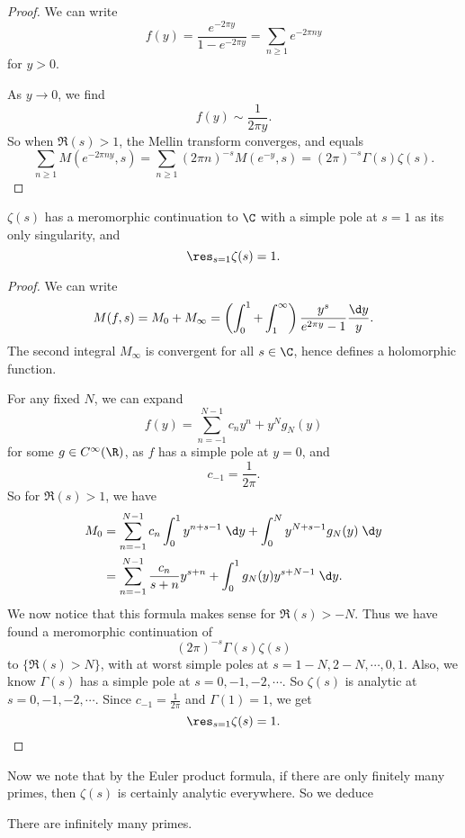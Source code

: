 \documentclass[a4paper]{article}
\begin{document}
\begin{proof}
  We can write
  \[
    f(y) = \frac{e^{-2\pi y}}{1 - e^{-2 \pi y}} = \sum_{n \geq 1} e^{-2\pi n y}
  \]
  for $y > 0$.

  As $y \to 0$, we find
  \[
    f(y) \sim \frac{1}{2\pi y}.
  \]
  So when $\Re(s) > 1$, the Mellin transform converges, and equals
  \[
    \sum_{n \geq 1} M(e^{-2\pi n y}, s) = \sum_{n \geq 1} (2\pi n)^{-s} M(e^{-y}, s) = (2\pi)^{-s} \Gamma(s) \zeta(s).
  \]
\end{proof}

\begin{cor}
  $\zeta(s)$ has a meromorphic continuation to $\C$ with a simple pole at $s = 1$ as its only singularity, and
  \[
    \res_{s = 1}\zeta(s) = 1.
  \]
\end{cor}

\begin{proof}
  We can write
  \[
    M(f, s) = M_0 + M_\infty = \left(\int_0^1 + \int_1^\infty\right) \frac{y^s}{e^{2\pi y} - 1} \frac{\d y}{y}.
  \]
  The second integral $M_\infty$ is convergent for all $s \in \C$, hence defines a holomorphic function.

  For any fixed $N$, we can expand
  \[
    f(y) = \sum_{n = -1}^{N - 1} c_n y^n + y^N g_N(y)
  \]
  for some $g \in C^\infty(\R)$, as $f$ has a simple pole at $y = 0$, and
  \[
    c_{-1} = \frac{1}{2\pi}.
  \]
  So for $\Re(s) > 1$, we have
  \begin{align*}
    M_0 &= \sum_{n = -1}^{N - 1} c_n \int_0^1 y^{n + s - 1} \;\d y + \int_0^N y^{N + s - 1} g_N(y) \;\d y\\
    &= \sum_{n = -1}^{N - 1} \frac{c_n}{s + n} y^{s + n} + \int_0^1 g_N(y) y^{s + N - 1} \;\d y.
  \end{align*}
  We now notice that this formula makes sense for $\Re(s) > -N$. Thus we have found a meromorphic continuation of
  \[
    (2\pi)^{-s} \Gamma(s) \zeta(s)
  \]
  to $\{\Re(s) > N\}$, with at worst simple poles at $s = 1 - N, 2 - N, \cdots, 0, 1$. Also, we know $\Gamma(s)$ has a simple pole at $s = 0, -1, -2, \cdots$. So $\zeta(s)$ is analytic at $s = 0, -1, -2, \cdots$. Since $c_{-1} = \frac{1}{2\pi}$ and $\Gamma(1) = 1$, we get
  \[
    \res_{s = 1} \zeta(s) = 1.
  \]
\end{proof}

Now we note that by the Euler product formula, if there are only finitely many primes, then $\zeta(s)$ is certainly analytic everywhere. So we deduce
\begin{cor}
  There are infinitely many primes.
\end{cor}
\end{document}
